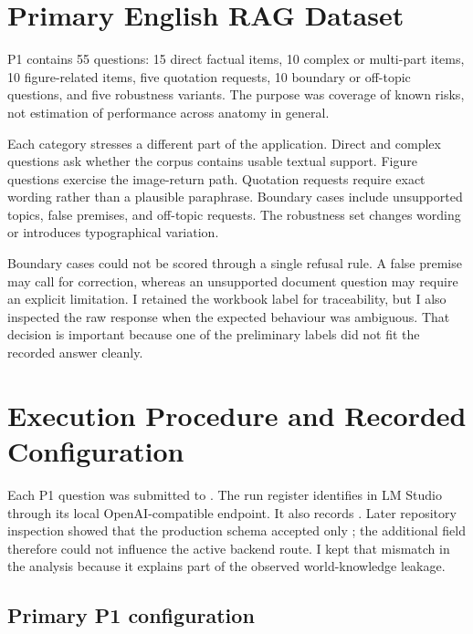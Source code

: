 \section{Primary English RAG Dataset}
\label{sec:rag-dataset}

P1 contains 55 questions: 15 direct factual items, 10 complex or multi-part items, 10 figure-related items, five quotation requests, 10 boundary or off-topic questions, and five robustness variants. The purpose was coverage of known risks, not estimation of performance across anatomy in general.

Each category stresses a different part of the application. Direct and complex questions ask whether the corpus contains usable textual support. Figure questions exercise the image-return path. Quotation requests require exact wording rather than a plausible paraphrase. Boundary cases include unsupported topics, false premises, and off-topic requests. The robustness set changes wording or introduces typographical variation.

Boundary cases could not be scored through a single refusal rule. A false premise may call for correction, whereas an unsupported document question may require an explicit limitation. I retained the workbook label for traceability, but I also inspected the raw response when the expected behaviour was ambiguous. That decision is important because one of the preliminary labels did not fit the recorded answer cleanly.

\section{Execution Procedure and Recorded Configuration}
\label{sec:rag-procedure}

Each P1 question was submitted to . The run register identifies  in LM Studio through its local OpenAI-compatible endpoint. It also records . Later repository inspection showed that the production  schema accepted only ; the additional field therefore could not influence the active backend route. I kept that mismatch in the analysis because it explains part of the observed world-knowledge leakage.

\subsection{Primary P1 configuration}
\label{subsec:p1-configuration}

